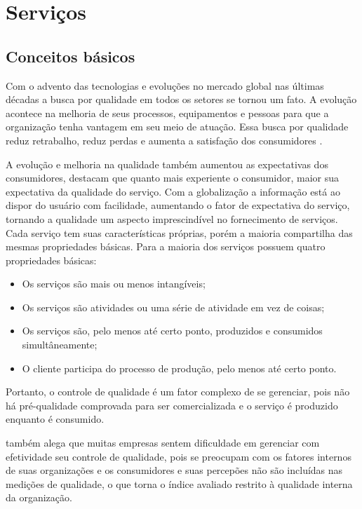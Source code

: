 \chapter[Serviços]{Serviços}

\section{Conceitos básicos}

Com o advento das tecnologias e evoluções no mercado global nas últimas décadas a busca por qualidade em todos os setores se tornou um fato. A evolução acontece na melhoria de seus processos, equipamentos e pessoas para que a organização tenha vantagem em seu meio de atuação. Essa busca por qualidade reduz retrabalho, reduz perdas e aumenta a satisfação dos consumidores \cite[p.~150]{slack2002}.

A evolução e melhoria na qualidade também aumentou as expectativas dos consumidores, \cite [p.~42]{parasuraman1991} destacam que quanto mais experiente o consumidor, maior sua expectativa da qualidade do serviço. Com a globalização a informação está ao dispor do usuário com facilidade, aumentando o fator de expectativa do serviço, tornando a qualidade um aspecto imprescindível no fornecimento de serviços. Cada serviço tem suas características próprias, porém a maioria compartilha das mesmas propriedades básicas. Para  a maioria dos serviços possuem quatro propriedades básicas:
\begin{itemize}
	\item Os serviços são mais ou menos intangíveis;
	\item Os serviços são atividades ou uma série de atividade em vez de coisas;
	\item Os serviços são, pelo menos até certo ponto, produzidos e consumidos simultâneamente;
	\item O cliente participa do processo de produção, pelo menos até certo ponto.
\end{itemize}


Portanto, o controle de qualidade é um fator complexo de se gerenciar, pois não há pré-qualidade comprovada para ser comercializada e o serviço é produzido enquanto é consumido.

\cite[p.~47]{gronroos1993} também alega que muitas empresas sentem dificuldade em gerenciar com efetividade seu controle de qualidade, pois se preocupam com os fatores internos de suas organizações e os consumidores e suas percepões não são incluídas nas medições de qualidade, o que torna o índice avaliado restrito à qualidade interna da organização.

